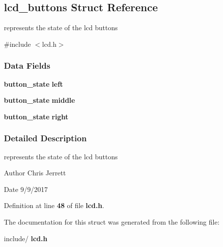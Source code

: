 \subsection{lcd\+\_\+buttons Struct Reference}
\label{structlcd__buttons}


represents the state of the lcd buttons  




{\ttfamily \#include $<$lcd.\+h$>$}

\subsubsection*{Data Fields}
\begin{DoxyCompactItemize}
\item 
\mbox{\label{structlcd__buttons_adf4426df10903d1dba0ee269473cb079}} 
\textbf{ button\+\_\+state} {\bfseries left}
\item 
\mbox{\label{structlcd__buttons_a682104bb266b516795b8533f269e0c74}} 
\textbf{ button\+\_\+state} {\bfseries middle}
\item 
\mbox{\label{structlcd__buttons_adfa688bb1cef42853f6eb2061f726e19}} 
\textbf{ button\+\_\+state} {\bfseries right}
\end{DoxyCompactItemize}


\subsubsection{Detailed Description}
represents the state of the lcd buttons 

\begin{DoxyAuthor}{Author}
Chris Jerrett 
\end{DoxyAuthor}
\begin{DoxyDate}{Date}
9/9/2017 
\end{DoxyDate}


Definition at line \textbf{ 48} of file \textbf{ lcd.\+h}.



The documentation for this struct was generated from the following file\+:\begin{DoxyCompactItemize}
\item 
include/\textbf{ lcd.\+h}\end{DoxyCompactItemize}

